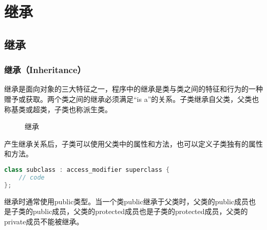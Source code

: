 \chapter{继承}

\section{继承}

\subsection{继承（Inheritance）}

继承是面向对象的三大特征之一，程序中的继承是类与类之间的特征和行为的一种赠予或获取。两个类之间的继承必须满足“is a”的关系。子类继承自父类，父类也称基类或超类，子类也称派生类。 \\

\begin{figure}[H]
	\centering
	\caption{继承}
\end{figure}

产生继承关系后，子类可以使用父类中的属性和方法，也可以定义子类独有的属性和方法。

\vspace{-0.5cm}

\begin{lstlisting}[language=Java]
class subclass : access_modifier superclass {
    // code
};
\end{lstlisting}

继承时通常使用public类型。当一个类public继承于父类时，父类的public成员也是子类的public成员，父类的protected成员也是子类的protected成员，父类的private成员不能被继承。 \\

